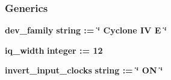 \subsubsection*{Generics}
 \begin{DoxyCompactItemize}
\item 
{\bf dev\+\_\+family} {\bfseries {\bfseries \textcolor{comment}{string}\textcolor{vhdlchar}{ }\textcolor{vhdlchar}{ }\textcolor{vhdlchar}{\+:}\textcolor{vhdlchar}{=}\textcolor{vhdlchar}{ }\textcolor{vhdlchar}{ }\textcolor{vhdlchar}{ }\textcolor{vhdlchar}{ }\textcolor{keyword}{\char`\"{} Cyclone I\+V E \char`\"{}}\textcolor{vhdlchar}{ }}}
\item 
{\bf iq\+\_\+width} {\bfseries {\bfseries \textcolor{comment}{integer}\textcolor{vhdlchar}{ }\textcolor{vhdlchar}{ }\textcolor{vhdlchar}{\+:}\textcolor{vhdlchar}{=}\textcolor{vhdlchar}{ }\textcolor{vhdlchar}{ } \textcolor{vhdldigit}{12} \textcolor{vhdlchar}{ }}}
\item 
{\bf invert\+\_\+input\+\_\+clocks} {\bfseries {\bfseries \textcolor{comment}{string}\textcolor{vhdlchar}{ }\textcolor{vhdlchar}{ }\textcolor{vhdlchar}{\+:}\textcolor{vhdlchar}{=}\textcolor{vhdlchar}{ }\textcolor{vhdlchar}{ }\textcolor{vhdlchar}{ }\textcolor{vhdlchar}{ }\textcolor{keyword}{\char`\"{} O\+N \char`\"{}}\textcolor{vhdlchar}{ }}}
\end{DoxyCompactItemize}
